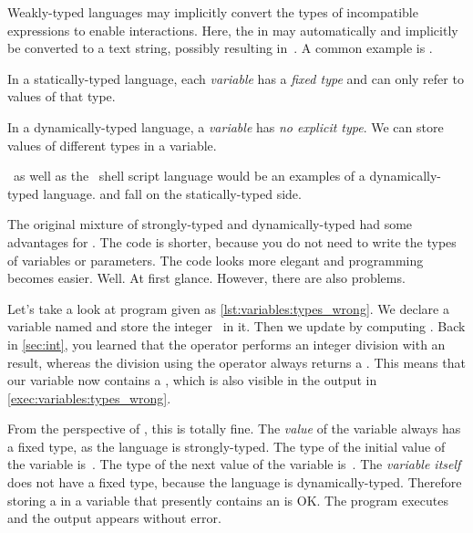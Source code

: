 %
Weakly-typed languages may implicitly convert the types of incompatible expressions to enable interactions.
Here, the  in  may automatically and implicitly be converted to a text string, possibly resulting in~.
A common example is .
%
\begin{definition}%
In a statically-typed language, each \emph{variable} has a \emph{fixed type} and can only refer to values of that type.%
\end{definition}%
%
\begin{definition}%
In a dynamically-typed language, a \emph{variable} has \emph{no explicit type}. %
We can store values of different types in a variable.%
\end{definition}%
%
\python\ as well as the \bash\ shell script language would be an examples of a dynamically-typed language.
 and  fall on the statically-typed side.

The original mixture of strongly-typed and dynamically-typed had some advantages for \python.
The code is shorter, because you do not need to write the types of variables or parameters.
The code looks more elegant and programming becomes easier.
Well.
At first glance.
However, there are also problems.

Let's take a look at program  given as \cref{lst:variables:types_wrong}.
We declare a variable named  and store the integer~ in it.
Then we update  by computing .
Back in \cref{sec:int}, you learned that the \pythonilIdx{//} operator performs an integer division with an  result, whereas the division using the \pythonilIdx{/} operator always returns a .
This means that our variable  now contains a , which is also visible in the output in \cref{exec:variables:types_wrong}.

From the perspective of \python, this is totally fine.
The \emph{value} of the variable always has a fixed type, as the language is strongly-typed.
The type of the initial value of the variable is~.
The type of the next value of the variable is~.
The \emph{variable itself} does not have a fixed type, because the language is dynamically-typed.
Therefore storing a  in a variable that presently contains an  is OK.
The program executes and the output appears without error.

